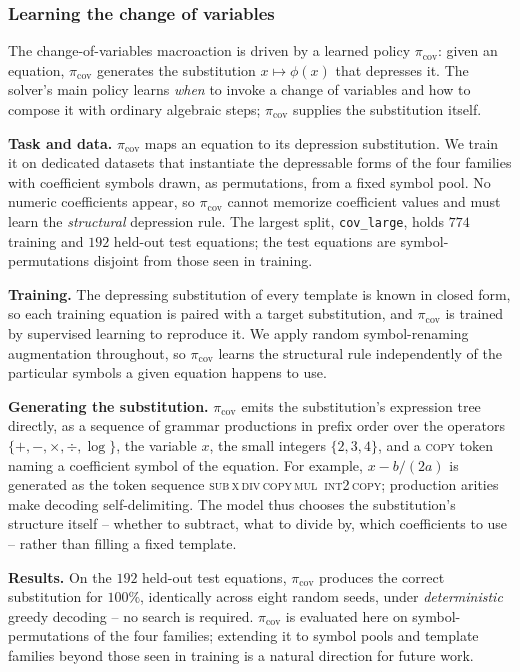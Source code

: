 \documentclass{article}
\theoremstyle{plain}
\theoremstyle{definition}
\theoremstyle{remark}
\begin{document}
\subsubsection{Learning the change of variables}
\label{sec:picov}

The change-of-variables macroaction is driven by a learned policy
$\pi_{\mathrm{cov}}$: given an equation, $\pi_{\mathrm{cov}}$ generates the
substitution $x \mapsto \phi(x)$ that depresses it. The solver's main policy
learns \emph{when} to invoke a change of variables and how to compose it with
ordinary algebraic steps; $\pi_{\mathrm{cov}}$ supplies the substitution
itself.

\textbf{Task and data.}
$\pi_{\mathrm{cov}}$ maps an equation to its depression substitution. We train
it on dedicated datasets that instantiate the depressable forms of the four
families with coefficient symbols drawn, as permutations, from a fixed symbol
pool. No numeric coefficients appear, so $\pi_{\mathrm{cov}}$ cannot memorize
coefficient values and must learn the \emph{structural} depression rule. The
largest split, \texttt{cov\_large}, holds $774$ training and $192$ held-out
test equations; the test equations are symbol-permutations disjoint from
those seen in training.

\textbf{Training.}
The depressing substitution of every template is known in closed form, so
each training equation is paired with a target substitution, and
$\pi_{\mathrm{cov}}$ is trained by supervised learning to reproduce it. We
apply random symbol-renaming augmentation throughout, so $\pi_{\mathrm{cov}}$
learns the structural rule independently of the particular symbols a given
equation happens to use.

\textbf{Generating the substitution.}
$\pi_{\mathrm{cov}}$ emits the substitution's expression tree directly, as a
sequence of grammar productions in prefix order over the operators
$\{+,-,\times,\div,\log\}$, the variable $x$, the small integers
$\{2,3,4\}$, and a \textsc{copy} token naming a coefficient symbol of the
equation. For example, $x - b/(2a)$ is generated as the token sequence
\textsc{sub}\,\textsc{x}\,\textsc{div}\,\textsc{copy}\,\textsc{mul}\,%
\textsc{int2}\,\textsc{copy}; production arities make decoding
self-delimiting. The model thus chooses the substitution's structure itself
-- whether to subtract, what to divide by, which coefficients to use --
rather than filling a fixed template.

\textbf{Results.}
On the $192$ held-out test equations, $\pi_{\mathrm{cov}}$ produces the
correct substitution for \textbf{$100\%$}, identically across eight random
seeds, under \emph{deterministic} greedy decoding -- no search is required.
$\pi_{\mathrm{cov}}$ is evaluated here on symbol-permutations of the four
families; extending it to symbol pools and template families beyond those
seen in training is a natural direction for future work.
\end{document}
